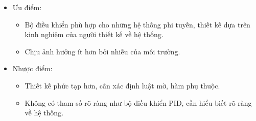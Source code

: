     \begin{itemize}
        \item Ưu điểm: 
        \begin{itemize}
            \item Bộ điều khiển phù hợp cho những hệ thống phi tuyến, thiết kế dựa trên kinh nghiệm của người thiết kế về hệ thống.
            \item Chịu ảnh hưởng ít hơn bởi nhiễu của môi trường.
        \end{itemize}
        \item Nhược điểm:
        \begin{itemize}
            \item Thiết kế phức tạp hơn, cần xác định luật mờ, hàm phụ thuộc.
            \item Không có tham số rõ ràng như bộ điều khiển PID, cần hiểu biết rõ ràng về hệ thống.
        \end{itemize}
    \end{itemize} 
